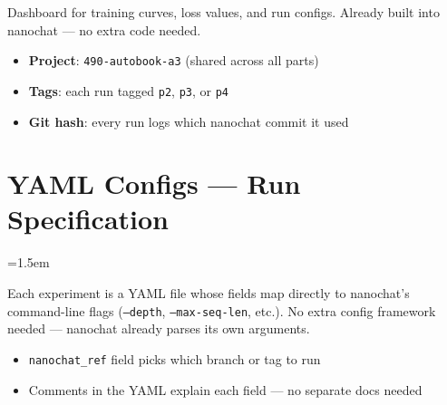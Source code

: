 \documentclass[9pt]{extarticle}
\begin{document}
Dashboard for training curves, loss values, and run configs. Already built into nanochat --- no extra code needed.

\begin{itemize}[nosep]
  \item \textbf{Project}: \texttt{490-autobook-a3} (shared across all parts)
  \item \textbf{Tags}: each run tagged \texttt{p2}, \texttt{p3}, or \texttt{p4}
  \item \textbf{Git hash}: every run logs which nanochat commit it used
\end{itemize}

\leftskip=0pt
\section*{YAML Configs --- Run Specification}
\leftskip=1.5em

Each experiment is a YAML file whose fields map directly to nanochat's command-line flags (\texttt{--depth}, \texttt{--max-seq-len}, etc.). No extra config framework needed --- nanochat already parses its own arguments.

\begin{itemize}[nosep]
  \item \texttt{nanochat\_ref} field picks which branch or tag to run
  \item Comments in the YAML explain each field --- no separate docs needed
\end{itemize}
\end{document}
